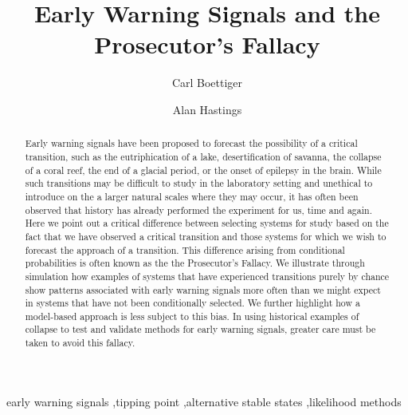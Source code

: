 \documentclass[authoryear,review,12pt]{elsarticle}
\begin{document}
\begin{frontmatter}
  \title{Early Warning Signals and the Prosecutor's Fallacy}
  \author[cpb]{Carl Boettiger}
  \author[esp]{Alan Hastings}
  \address[cpb]{Center for Population Biology, 1 Shields Avenue, University of California, Davis, CA, 95616 United States.}
  \address[esp]{Department of Environmental Science and Policy, University of California, Davis} 


  \begin{abstract}

  Early warning signals have been proposed to forecast the possibility of a 
  critical transition, such as the eutriphication of a lake, desertification
  of savanna, the collapse of a coral reef, the end of a glacial period, or 
  the onset of epilepsy in the brain.  While such transitions may be difficult
  to study in the laboratory setting and unethical to introduce on the a larger
  natural scales where they may occur, it has often been observed that history
  has already performed the experiment for us, time and again.  Here we point 
  out a critical difference between selecting systems for study based on the 
  fact that we have observed a critical transition and those systems for which
  we wish to forecast the approach of a transition. This difference arising
  from conditional probabilities is often known as the the Prosecutor's 
  Fallacy.  We illustrate through simulation how examples of systems that have 
  experienced transitions purely by chance show patterns associated with 
  early warning signals more often than we might expect in systems that have not
  been conditionally selected.  We further highlight how a model-based approach
  is less subject to this bias.  In using historical examples of collapse to 
  test and validate methods for early warning signals, greater care must be taken
  to avoid this fallacy.
 
  \end{abstract}

  \begin{keyword}
early warning signals \sep tipping point \sep alternative stable states \sep likelihood methods 
   \end{keyword}
 \end{frontmatter}
\end{document}
